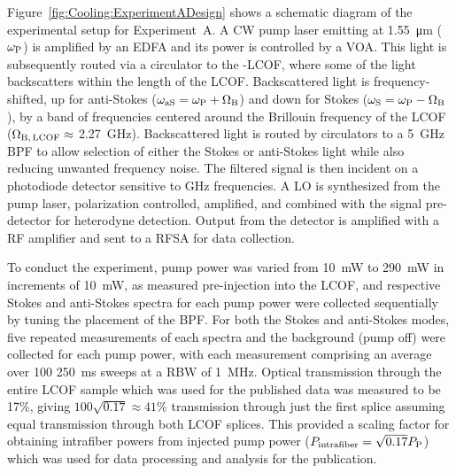 Figure~\ref{fig:Cooling:ExperimentADesign} shows a schematic diagram of the experimental setup for Experiment~A. A \ac{CW} pump laser emitting at \SI{1.55}{\micro\meter} (\(\omega_{\rm P}\)) is amplified by an \ac{EDFA} and its power is controlled by a \ac{VOA}. This light is subsequently routed via a circulator to the -\ac{LCOF}, where some of the light backscatters within the length of the \ac{LCOF}. Backscattered light is frequency-shifted, up for anti-Stokes (\(\omega_{\rm aS} = \omega_{\rm P} + \Omega_{\mathrm{B}}\)) and down for Stokes
(\(\omega_{\rm S} = \omega_{\rm P} - \Omega_{\rm B}\)),
by a band of frequencies centered around the Brillouin frequency of the \ac{LCOF} (\(\Omega_{\rm B,\,LCOF} \approx\) \SI{2.27}{\giga\hertz}). Backscattered light is routed by circulators to a \SI{5}{\giga\hertz} \ac{BPF} to allow selection of either the Stokes or anti-Stokes light while also reducing unwanted frequency noise. The filtered signal is then incident on a photodiode detector sensitive to \si{\giga\hertz} frequencies. A \ac{LO} is synthesized from the pump laser, polarization controlled, amplified, and combined with the signal pre-detector for heterodyne detection. Output from the detector is amplified with a \ac{RF} amplifier and sent to a \ac{RFSA} for data collection.

To conduct the experiment, pump power was varied from \SI{10}{\milli\watt} to \SI{290}{\milli\watt} in increments of \SI{10}{\milli\watt}, as measured pre-injection into the \ac{LCOF}, and respective Stokes and anti-Stokes spectra for each pump power were collected sequentially by tuning the placement of the \ac{BPF}. For both the Stokes and anti-Stokes modes, five repeated measurements of each spectra and the background (pump off) were collected for each pump power, with each measurement comprising an average over 100 \SI{250}{\milli\second} sweeps at a \ac{RBW} of \SI{1}{\mega\hertz}. Optical transmission through the entire \ac{LCOF} sample which was used for the published data was measured to be 17\%, giving \(100\sqrt{0.17} \approx 41\%\) transmission through just the first splice assuming equal transmission through both \ac{LCOF} splices. This provided a scaling factor for obtaining intrafiber powers from injected pump power (\(P_{\rm intrafiber} = \sqrt{0.17}P_{\rm P}\)) which was used for data processing and analysis for the publication.

